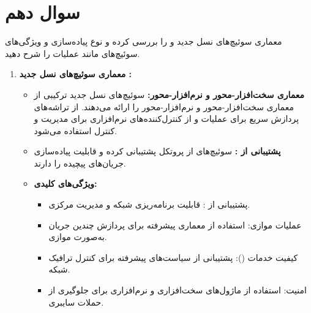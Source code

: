 \section{سوال دهم}

معماری سوئیچ‌های نسل جدید  و  را بررسی کرده و نوع پیاده‌سازی و ویژگی‌های سوئیچ‌های  مانند عملیات  را شرح دهید.

\begin{qsolve}
	\begin{enumerate}
		\item \textbf{معماری سوئیچ‌های نسل جدید :}
		\begin{itemize}
			\item \textbf{معماری سخت‌افزار-محور و نرم‌افزار-محور:} سوئیچ‌های نسل جدید  ترکیبی از معماری سخت‌افزار-محور و نرم‌افزار-محور را ارائه می‌دهند. از تراشه‌های پردازش سریع برای عملیات  و از کنترل‌کننده‌های نرم‌افزاری برای مدیریت و کنترل استفاده می‌شود.
			\item \textbf{پشتیبانی از :} سوئیچ‌های  از پروتکل  پشتیبانی کرده و قابلیت پیاده‌سازی جریان‌های پیچیده را دارند.
			\item \textbf{ویژگی‌های کلیدی:}
			\begin{itemize}
				\item پشتیبانی از : قابلیت برنامه‌ریزی شبکه و مدیریت مرکزی.
				\item عملیات موازی: استفاده از معماری پیشرفته برای پردازش چندین جریان به‌صورت موازی.
				\item کیفیت خدمات (): پشتیبانی از سیاست‌های پیشرفته  برای کنترل ترافیک شبکه.
				\item امنیت: استفاده از ماژول‌های سخت‌افزاری و نرم‌افزاری برای جلوگیری از حملات سایبری.
			\end{itemize}
		\end{itemize}
		

\end{enumerate}
\end{qsolve}
